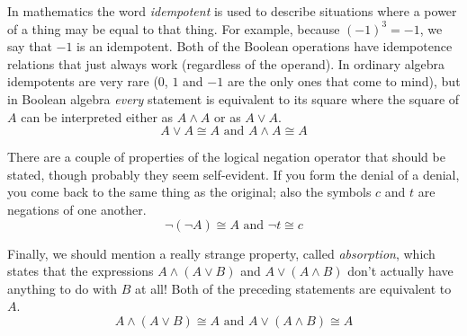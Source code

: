 \documentclass[10pt,]{book}
\theoremstyle{plain}
\theoremstyle{definition}
\theoremstyle{definition}
\numberwithin{equation}{section}
\begin{document}
    In mathematics the word \emph{idempotent} is used to describe situations where
    a power of a thing may be equal to that thing. For example, because \((-1)^3 = -1\), we say that \(-1\) is an idempotent. Both of the Boolean operations
    have idempotence relations that just always work (regardless of the operand).
    In ordinary algebra idempotents are very rare (\(0\), \(1\) and \(-1\) are the only
    ones that come to mind), but in Boolean algebra \emph{every} statement
    is equivalent to its square \textemdash{} where the square of \(A\) can be interpreted
    either as \(A \land A\) or as \(A \lor A\).
    \begin{equation*}
      A \lor A \cong A \mbox{ and } 
      A \land A \cong A
    \end{equation*}
\par

    There are a couple of properties of the logical negation operator
    that should be stated, though probably they seem self-evident.
    If you form the denial of a denial, you come back to the
    same thing as the original; also the symbols \(c\) and \(t\) are negations
    of one another.
    \begin{equation*}
      \lnot({\lnot}A) \cong A \mbox{ and } 
      {\lnot}t  \cong c
    \end{equation*}
\par

    Finally, we should mention a really strange property, called
    \emph{absorption},
    which states that the expressions \(A \land (A \lor B)\) and \(A \lor (A \land B)\)
    don't actually have anything to do with \(B\) at all! Both of the preceding
    statements are equivalent to \(A\).
    \begin{equation*}
      A \land (A \lor B) \cong A \mbox{ and } 
      A \lor (A \land B) \cong A
    \end{equation*}
\par
\end{document}

